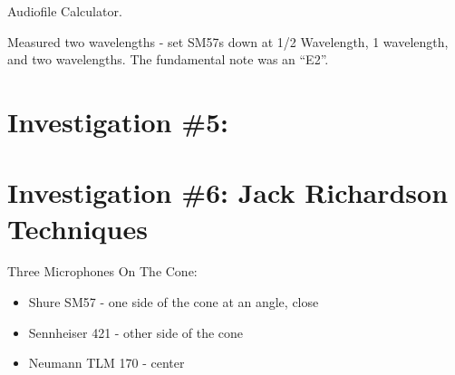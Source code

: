 \documentclass{article}
\begin{document}
Audiofile Calculator.

\medskip

Measured two wavelengths - set SM57s down at 1/2 Wavelength, 1 wavelength, and two wavelengths. The fundamental note was an ``E2''.



\section{Investigation \#5:}



\section{Investigation \#6: Jack Richardson Techniques}

Three Microphones On The Cone:

\begin{itemize}
\item Shure SM57 - one side of the cone at an angle, close
\item Sennheiser 421 - other side of the cone 
\item Neumann TLM 170 - center
\end{itemize}
\end{document}
